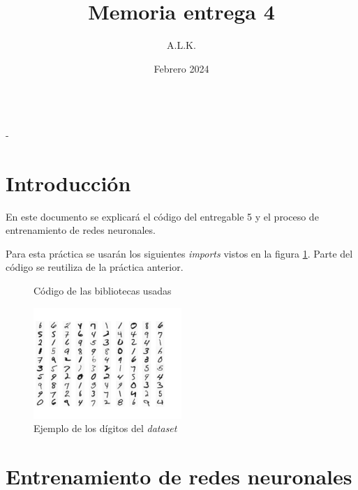 \documentclass[6pt]{AiTex}
\title{Memoria entrega 4}
\author{A.L.K.}
\date{Febrero 2024}
\begin{document}
\justify

\begin{center}

    {\huge \textbf{\underline{\subtitulo}}} \\
    { \lesson - \autor}

\end{center}


\section*{Introducción}

En este documento se explicará el código del entregable 5 y el proceso de entrenamiento de redes neuronales.

Para esta práctica se usarán los siguientes \textit{imports} vistos en la figura \ref{fig:imports}. Parte del código se reutiliza de la práctica anterior.
\begin{figure}[H]
    \centering
    
    \caption{Código de las bibliotecas usadas}
    \label{fig:imports}
\end{figure}

\begin{figure}[H]
    \centering
    \includegraphics[width=0.5\textwidth]{./imagenes/dataset.png}
    \caption{Ejemplo de los dígitos del \textit{dataset}}
    \label{fig:digitos}
\end{figure}

\section{Entrenamiento de redes neuronales}
\end{document}
